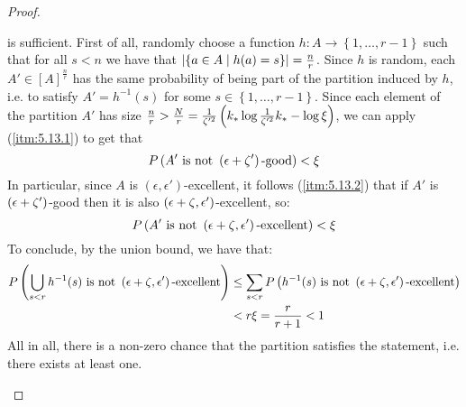 \begin{proof}
\begin{enumerate}[label=(\alph*), ref=\alph*]
                is sufficient.
                First of all, randomly choose a function $h: A \longrightarrow \left\{ 1, \dots, r-1 \right\}$ such that
                for all $s < n$ we have that $\left| \left\{ a \in A \mid h(a) = s \right\} \right| = \frac{n}{r}$.
                Since $h$ is random, each $A' \in [A]^\frac{n}{r}$ has the same probability of being part of the partition
                induced by $h$, i.e. to satisfy $A' = h^{-1}(s)$ for some $s \in \left\{ 1, \dots, r-1 \right\}$.
                Since each element of the partition $A'$ has size
                $\frac{n}{r} > \frac{N}{r} = \frac{1}{\zeta'^2}\left( k_* \log{\frac{1}{\zeta'^2}k_*} - \log{\xi} \right)$,
                we can apply (\ref{itm:5.13.1}) to get that
                $$
                    P\left( A' \text{ is not } \left( \epsilon + \zeta' \right)\text{-good} \right) < \xi
                $$
                In particular, since $A$ is $(\epsilon, \epsilon')$-excellent, it follows (\ref{itm:5.13.2}) that if $A'$ is
                $\left( \epsilon + \zeta' \right)$-good then it is also $\left( \epsilon + \zeta, \epsilon' \right)$-excellent, so:
                $$
                    P\left( A' \text{ is not } \left( \epsilon + \zeta, \epsilon' \right)\text{-excellent} \right) < \xi
                $$
                To conclude, by the union bound, we have that:
                \begin{align*}
                    P\left( \bigcup_{s < r} h^{-1}(s) \text{ is not } \left( \epsilon + \zeta, \epsilon' \right)\text{-excellent} \right)
                        & \leq \sum_{s < r} P\left( h^{-1}(s) \text{ is not } \left( \epsilon + \zeta, \epsilon' \right)\text{-excellent} \right) \\
                        & < r \xi = \frac{r}{r+1} < 1
                \end{align*}
                All in all, there is a non-zero chance that the partition satisfies the statement, i.e. there exists at least one.
        \end{enumerate}
        \end{proof}

